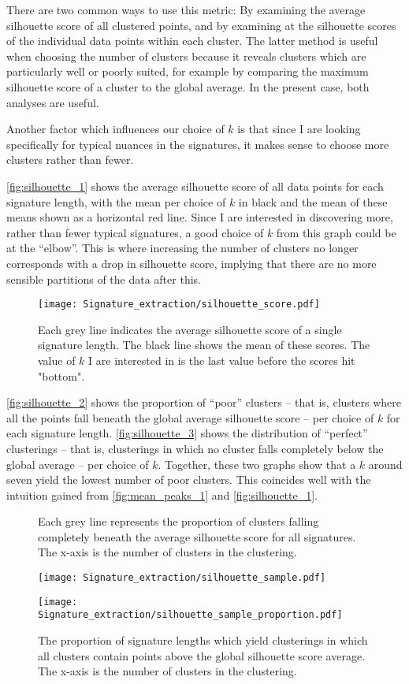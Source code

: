 \documentclass[12pt, american]{report}
\begin{document}
There are two common ways to use this metric: By examining the average silhouette score of all clustered points, and by examining at the silhouette scores of the individual data points within each cluster. The latter method is useful when choosing the number of clusters because it reveals clusters which are particularly well or poorly suited, for example by comparing the maximum silhouette score of a cluster to the global average. In the present case, both analyses are useful. 

Another factor which influences our choice of $k$ is that since I are looking specifically for typical nuances in the signatures, it makes sense to choose more clusters rather than fewer. 

\autoref{fig:silhouette_1} shows the average silhouette score of all data points for each signature length, with the mean per choice of $k$ in black and the mean of these means shown as a horizontal red line. Since I are interested in discovering more, rather than fewer typical signatures, a good choice of $k$ from this graph could be at the “elbow”. This is where increasing the number of clusters no longer corresponds with a drop in silhouette score, implying that there are no more sensible partitions of the data after this.  

\begin{figure}
\centering
\caption{Each grey line indicates the average silhouette score of a single signature length. The black line shows the mean of these scores. The value of $k$ I are interested in is the last value before the scores hit "bottom". }
\label{fig:silhouette_1}
\texttt{[image: Signature\_extraction/silhouette\_score.pdf]}
\end{figure}

\autoref{fig:silhouette_2} shows the proportion of “poor” clusters – that is, clusters where all the points fall beneath the global average silhouette score – per choice of $k$ for each signature length. \autoref{fig:silhouette_3} shows the distribution of “perfect” clusterings – that is, clusterings in which no cluster falls completely below the global average – per choice of $k$. Together, these two graphs show that a $k$ around seven yield the lowest number of poor clusters. This coincides well with the intuition gained from \autoref{fig:mean_peaks_1} and \autoref{fig:silhouette_1}. 

\begin{figure}
\centering
\caption{Each grey line represents the proportion of clusters falling completely beneath the average silhouette score for all signatures. The x-axis is the number of clusters in the clustering.}
\label{fig:silhouette_2}
\texttt{[image: Signature\_extraction/silhouette\_sample.pdf]}
\caption{ The proportion of signature lengths which yield clusterings in which all clusters contain points above the global silhouette score average. The x-axis is the number of clusters in the clustering.}
\label{fig:silhouette_3}
\texttt{[image: Signature\_extraction/silhouette\_sample\_proportion.pdf]}
\end{figure}
\end{document}
